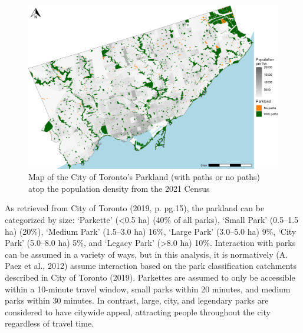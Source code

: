 \documentclass[
11pt, %
oneside, %
english, %
singlespacing, %
]{macthesis} %
\begin{document}
\begin{figure}

{\centering \includegraphics[width=6in]{./data/figures/chp3-parkland_paths_plot} 

}

\caption{\label{fig:chp3-parkland_paths_plot}Map of the City of Toronto's Parkland (with paths or no paths) atop the population density from the 2021 Census}\label{fig:unnamed-chunk-45}
\end{figure}

As retrieved from City of Toronto (2019, p. pg.15), the parkland can be categorized by size: `Parkette' (\textless0.5 ha) (40\% of all parks), `Small Park' (0.5--1.5 ha) (20\%), `Medium Park' (1.5--3.0 ha) 16\%, `Large Park' (3.0--5.0 ha) 9\%, `City Park' (5.0--8.0 ha) 5\%, and `Legacy Park' (\textgreater8.0 ha) 10\%. Interaction with parks can be assumed in a variety of ways, but in this analysis, it is normatively (A. Paez et al., 2012) assume interaction based on the park classification catchments described in City of Toronto (2019). Parkettes are assumed to only be accessible within a 10-minute travel window, small parks within 20 minutes, and medium parks within 30 minutes. In contrast, large, city, and legendary parks are considered to have citywide appeal, attracting people throughout the city regardless of travel time.
\end{document}
